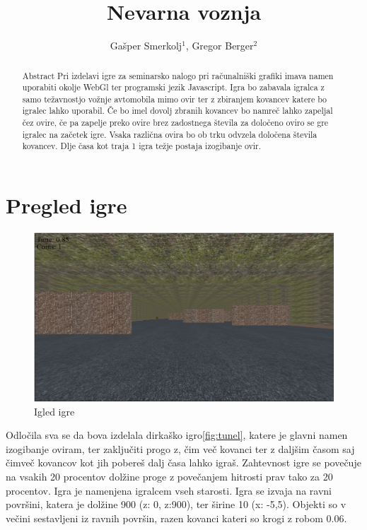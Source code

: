 \documentclass[a4paper]{article}
\begin{document}
\title{Nevarna voznja}

\author{Gašper Smerkolj$^{1}$, Gregor Berger$^{2}$} %



\maketitle


\begin{abstract}{Abstract}
Pri izdelavi igre za seminarsko nalogo pri računalniški grafiki imava namen uporabiti okolje WebGl ter programski jezik Javascript. Igra bo zabavala igralca z samo težavnostjo vožnje avtomobila mimo ovir ter z zbiranjem kovancev katere bo igralec lahko uporabil. Če bo imel dovolj zbranih kovancev bo namreč lahko zapeljal čez ovire, če pa zapelje preko ovire brez zadostnega števila za določeno oviro se gre igralec na začetek igre. Vsaka različna ovira bo
ob trku odvzela določena števila kovancev. Dlje časa kot traja 1 igra težje postaja izogibanje ovir.
\end{abstract}


\section{Pregled igre}
\begin{figure}[!htb]
	\begin{center}
		\includegraphics[width=\columnwidth]{gameplay.png}
		\caption{Igled igre} \label{fig:gameplay}
	\end{center}
\end{figure}
Odločila sva se da bova izdelala dirkaško igro\ref{fig:tunel}, katere je glavni namen izogibanje oviram, ter zaključiti progo z, čim več kovanci ter z daljšim časom saj čimveč kovancov kot jih pobereš dalj časa lahko igraš. Zahtevnost igre se povečuje na vsakih 20 procentov dolžine proge z povečanjem hitrosti prav tako za 20 procentov.
Igra je namenjena igralcem vseh starosti.
Igra se izvaja na ravni površini, katera je dolžine 900 (z: 0, z:900), ter širine 10 (x: -5,5). Objekti so v večini sestavljeni iz ravnih površin, razen kovanci kateri so krogi z robom 0.06.
\end{document}
